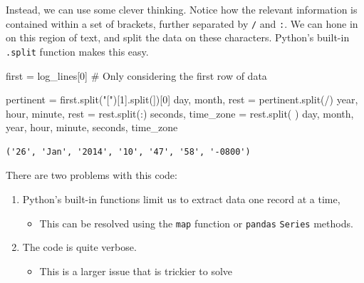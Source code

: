 \documentclass[
  letterpaper,
  DIV=11,
  numbers=noendperiod]{scrreprt}
\newenvironment{Shaded}{\begin{snugshade}}{\end{snugshade}}
\newcommand{\CommentTok}[1]{\textcolor[rgb]{0.37,0.37,0.37}{#1}}
\newcommand{\DecValTok}[1]{\textcolor[rgb]{0.68,0.00,0.00}{#1}}
\newcommand{\NormalTok}[1]{\textcolor[rgb]{0.00,0.23,0.31}{#1}}
\newcommand{\OperatorTok}[1]{\textcolor[rgb]{0.37,0.37,0.37}{#1}}
\newcommand{\StringTok}[1]{\textcolor[rgb]{0.13,0.47,0.30}{#1}}
\providecommand{\tightlist}{%
  \setlength{\itemsep}{0pt}\setlength{\parskip}{0pt}}\usepackage{longtable,booktabs,array}
\begin{document}
Instead, we can use some clever thinking. Notice how the relevant
information is contained within a set of brackets, further separated by
\texttt{/} and \texttt{:}. We can hone in on this region of text, and
split the data on these characters. Python's built-in \texttt{.split}
function makes this easy.

\begin{Shaded}
\begin{Highlighting}[]
\NormalTok{first }\OperatorTok{=}\NormalTok{ log\_lines[}\DecValTok{0}\NormalTok{] }\CommentTok{\# Only considering the first row of data}

\NormalTok{pertinent }\OperatorTok{=}\NormalTok{ first.split(}\StringTok{"["}\NormalTok{)[}\DecValTok{1}\NormalTok{].split(}\StringTok{\textquotesingle{}]\textquotesingle{}}\NormalTok{)[}\DecValTok{0}\NormalTok{]}
\NormalTok{day, month, rest }\OperatorTok{=}\NormalTok{ pertinent.split(}\StringTok{\textquotesingle{}/\textquotesingle{}}\NormalTok{)}
\NormalTok{year, hour, minute, rest }\OperatorTok{=}\NormalTok{ rest.split(}\StringTok{\textquotesingle{}:\textquotesingle{}}\NormalTok{)}
\NormalTok{seconds, time\_zone }\OperatorTok{=}\NormalTok{ rest.split(}\StringTok{\textquotesingle{} \textquotesingle{}}\NormalTok{)}
\NormalTok{day, month, year, hour, minute, seconds, time\_zone}
\end{Highlighting}
\end{Shaded}

\begin{verbatim}
('26', 'Jan', '2014', '10', '47', '58', '-0800')
\end{verbatim}

There are two problems with this code:

\begin{enumerate}
\def\labelenumi{\arabic{enumi}.}
\tightlist
\item
  Python's built-in functions limit us to extract data one record at a
  time,

  \begin{itemize}
  \tightlist
  \item
    This can be resolved using the \texttt{map} function or
    \texttt{pandas} \texttt{Series} methods.
  \end{itemize}
\item
  The code is quite verbose.

  \begin{itemize}
  \tightlist
  \item
    This is a larger issue that is trickier to solve
  \end{itemize}
\end{enumerate}
\end{document}
